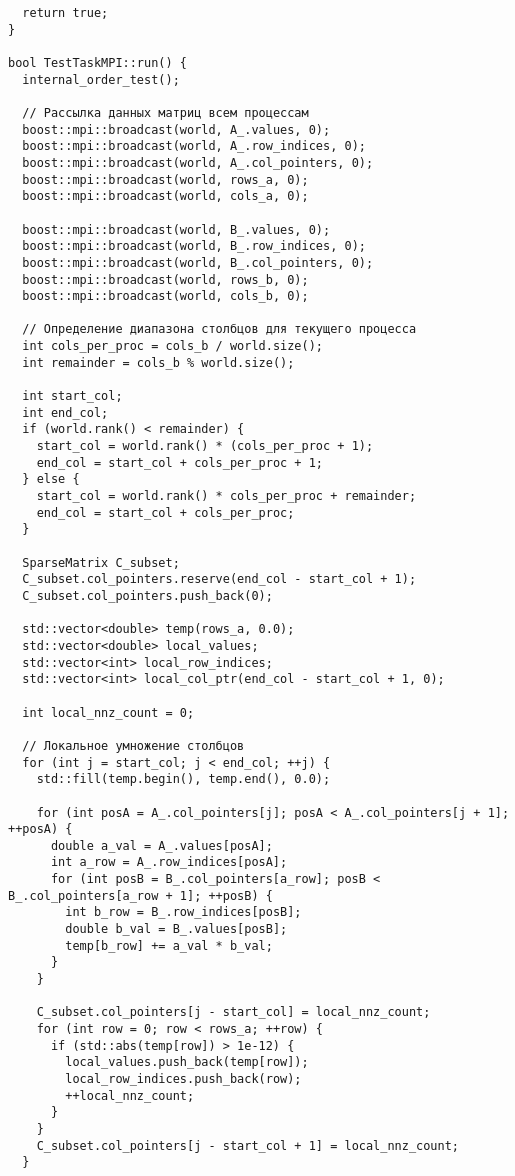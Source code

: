 \documentclass[12pt]{article}
\begin{document}
\begin{verbatim}
  return true;
}

bool TestTaskMPI::run() {
  internal_order_test();

  // Рассылка данных матриц всем процессам
  boost::mpi::broadcast(world, A_.values, 0);
  boost::mpi::broadcast(world, A_.row_indices, 0);
  boost::mpi::broadcast(world, A_.col_pointers, 0);
  boost::mpi::broadcast(world, rows_a, 0);
  boost::mpi::broadcast(world, cols_a, 0);

  boost::mpi::broadcast(world, B_.values, 0);
  boost::mpi::broadcast(world, B_.row_indices, 0);
  boost::mpi::broadcast(world, B_.col_pointers, 0);
  boost::mpi::broadcast(world, rows_b, 0);
  boost::mpi::broadcast(world, cols_b, 0);

  // Определение диапазона столбцов для текущего процесса
  int cols_per_proc = cols_b / world.size();
  int remainder = cols_b % world.size();

  int start_col;
  int end_col;
  if (world.rank() < remainder) {
    start_col = world.rank() * (cols_per_proc + 1);
    end_col = start_col + cols_per_proc + 1;
  } else {
    start_col = world.rank() * cols_per_proc + remainder;
    end_col = start_col + cols_per_proc;
  }

  SparseMatrix C_subset;
  C_subset.col_pointers.reserve(end_col - start_col + 1);
  C_subset.col_pointers.push_back(0);

  std::vector<double> temp(rows_a, 0.0);
  std::vector<double> local_values;
  std::vector<int> local_row_indices;
  std::vector<int> local_col_ptr(end_col - start_col + 1, 0);

  int local_nnz_count = 0;

  // Локальное умножение столбцов
  for (int j = start_col; j < end_col; ++j) {
    std::fill(temp.begin(), temp.end(), 0.0);

    for (int posA = A_.col_pointers[j]; posA < A_.col_pointers[j + 1]; ++posA) {
      double a_val = A_.values[posA];
      int a_row = A_.row_indices[posA];
      for (int posB = B_.col_pointers[a_row]; posB < B_.col_pointers[a_row + 1]; ++posB) {
        int b_row = B_.row_indices[posB];
        double b_val = B_.values[posB];
        temp[b_row] += a_val * b_val;
      }
    }

    C_subset.col_pointers[j - start_col] = local_nnz_count;
    for (int row = 0; row < rows_a; ++row) {
      if (std::abs(temp[row]) > 1e-12) {
        local_values.push_back(temp[row]);
        local_row_indices.push_back(row);
        ++local_nnz_count;
      }
    }
    C_subset.col_pointers[j - start_col + 1] = local_nnz_count;
  }


\end{verbatim}
\end{document}
